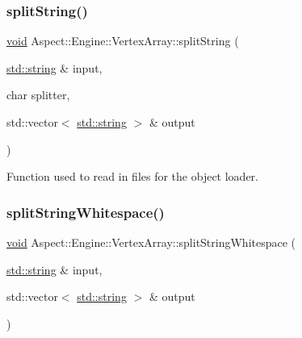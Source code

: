 \subsubsection{\texorpdfstring{split\+String()}{splitString()}}
{\footnotesize\ttfamily \mbox{\hyperlink{_s_d_l__opengles2__gl2ext_8h_ae5d8fa23ad07c48bb609509eae494c95}{void}} Aspect\+::\+Engine\+::\+Vertex\+Array\+::split\+String (\begin{DoxyParamCaption}\item[{\mbox{\hyperlink{_s_d_l__opengl__glext_8h_ae84541b4f3d8e1ea24ec0f466a8c568b}{std\+::string}} \&}]{input,  }\item[{char}]{splitter,  }\item[{std\+::vector$<$ \mbox{\hyperlink{_s_d_l__opengl__glext_8h_ae84541b4f3d8e1ea24ec0f466a8c568b}{std\+::string}} $>$ \&}]{output }\end{DoxyParamCaption})\hspace{0.3cm}{\ttfamily [private]}}



Function used to read in files for the object loader. 

\mbox{\label{class_aspect_1_1_engine_1_1_vertex_array_aeea4f92339da156685950a8426ad59b6}} 
\subsubsection{\texorpdfstring{split\+String\+Whitespace()}{splitStringWhitespace()}}
{\footnotesize\ttfamily \mbox{\hyperlink{_s_d_l__opengles2__gl2ext_8h_ae5d8fa23ad07c48bb609509eae494c95}{void}} Aspect\+::\+Engine\+::\+Vertex\+Array\+::split\+String\+Whitespace (\begin{DoxyParamCaption}\item[{\mbox{\hyperlink{_s_d_l__opengl__glext_8h_ae84541b4f3d8e1ea24ec0f466a8c568b}{std\+::string}} \&}]{input,  }\item[{std\+::vector$<$ \mbox{\hyperlink{_s_d_l__opengl__glext_8h_ae84541b4f3d8e1ea24ec0f466a8c568b}{std\+::string}} $>$ \&}]{output }\end{DoxyParamCaption})\hspace{0.3cm}{\ttfamily [private]}}



